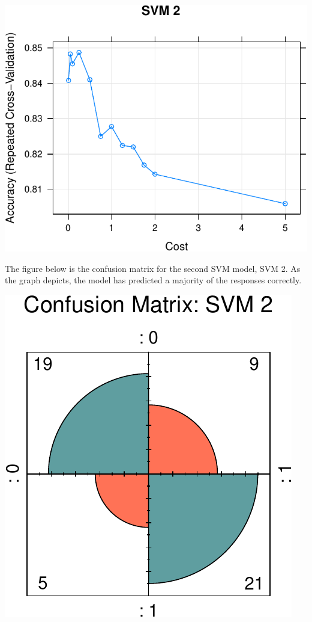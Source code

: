 \documentclass[11pt,preprint, authoryear]{elsarticle}
\numberwithin{equation}{section}
\numberwithin{figure}{section}
\numberwithin{table}{section}
\begin{document}
\begin{center}\includegraphics{ML_project_files/figure-latex/unnamed-chunk-20-1} \end{center}

The figure below is the confusion matrix for the second SVM model, SVM
2. As the graph depicts, the model has predicted a majority of the
responses correctly.

\begin{center}\includegraphics{ML_project_files/figure-latex/unnamed-chunk-22-1} \end{center}
\end{document}
